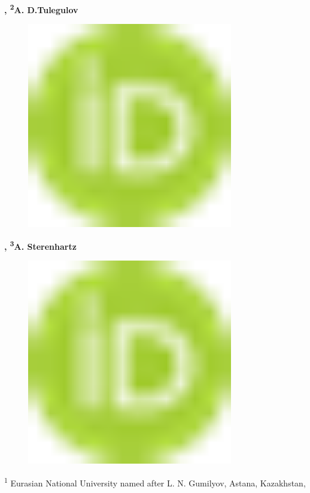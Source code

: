 {\bfseries ,
\textsuperscript{2}A.
D.Tulegulov}
\begin{figure}[H]
	\centering
	\includegraphics[width=0.8\textwidth]{media/ict2/image1}
	\caption*{}
\end{figure}
{\bfseries ,
\textsuperscript{3}A.
Sterenhartz}
\begin{figure}[H]
	\centering
	\includegraphics[width=0.8\textwidth]{media/ict2/image1}
	\caption*{}
\end{figure}


\textsuperscript{1} Eurasian National University named after L. N.
Gumilyov, Astana, Kazakhstan,

